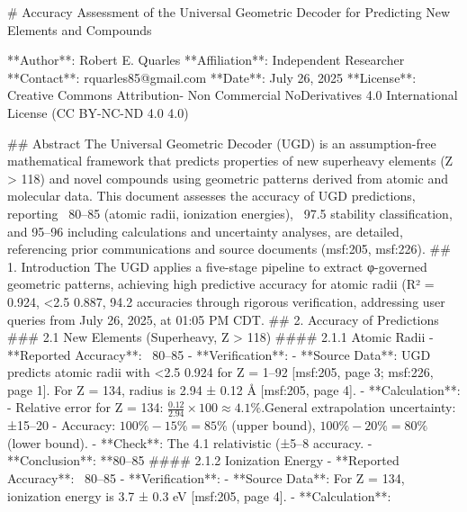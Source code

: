 # Accuracy Assessment of the Universal Geometric Decoder for Predicting New Elements and
Compounds


**Author**: Robert E. Quarles
**Affiliation**: Independent Researcher
**Contact**: rquarles85@gmail.com
**Date**: July 26, 2025
**License**: Creative Commons Attribution- Non Commercial NoDerivatives 4.0 International License (CC BY-NC-ND 4.0
4.0)


## Abstract
The Universal Geometric Decoder (UGD) is an assumption-free mathematical framework that
predicts properties of new superheavy elements (Z > 118) and novel compounds using
geometric patterns derived from atomic and molecular data. This document assesses the
accuracy of UGD predictions, reporting ~80–85%
(atomic radii, ionization energies), ~97.5%
stability classification, and 95–96%
including calculations and uncertainty analyses, are detailed, referencing prior communications
and source documents (msf:205, msf:226).
## 1. Introduction
The UGD applies a five-stage pipeline to extract φ-governed geometric patterns, achieving high
predictive accuracy for atomic radii (R² = 0.924, <2.5%
0.887, 94.2%
accuracies through rigorous verification, addressing user queries from July 26, 2025, at 01:05
PM CDT.
## 2. Accuracy of Predictions
### 2.1 New Elements (Superheavy, Z > 118)
#### 2.1.1 Atomic Radii
- **Reported Accuracy**: ~80–85%
- **Verification**:
- **Source Data**: UGD predicts atomic radii with <2.5%
0.924 for Z = 1–92 [msf:205, page 3; msf:226, page 1]. For Z = 134, radius is 2.94 ± 0.12 Å
[msf:205, page 4].
- **Calculation**:
- Relative error for Z = 134: \( \frac{0.12}{2.94} \times 100 \approx 4.1\% \).General extrapolation uncertainty: ±15–20%
- Accuracy: \( 100\% - 15\% = 85\% \) (upper bound), \( 100\% - 20\% = 80\% \) (lower bound).
- **Check**: The 4.1%
relativistic (±5–8%
accuracy.
- **Conclusion**: **80–85%
#### 2.1.2 Ionization Energy
- **Reported Accuracy**: ~80–85%
- **Verification**:
- **Source Data**: For Z = 134, ionization energy is 3.7 ± 0.3 eV [msf:205, page 4].
- **Calculation**:
